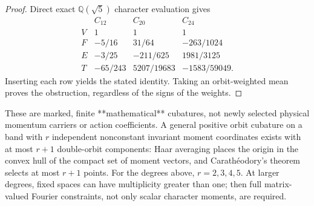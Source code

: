\documentclass[11pt]{article}
\begin{document}
\begin{proof}
Direct exact $\mathbb Q(\sqrt5)$ character evaluation gives
\[
\begin{array}{c|ccc}
& C_{12}&C_{20}&C_{24}\\\hline
V&1&1&1\\
F&-5/16&31/64&-263/1024\\
E&-3/25&-211/625&1981/3125\\
T&-65/243&5207/19683&-1583/59049.
\end{array}
\]
Inserting each row yields the stated identity. Taking an orbit-weighted
mean proves the obstruction, regardless of the signs of the weights.
\end{proof}

\begin{remark}
These are marked, finite **mathematical** cubatures, not newly selected
physical momentum carriers or action coefficients. A general positive
orbit cubature on a band with $r$ independent nonconstant invariant
moment coordinates exists with at most $r+1$ double-orbit components:
Haar averaging places the origin in the convex hull of the compact set
of moment vectors, and Carath\'eodory's theorem selects at most $r+1$
points. For the degrees above, $r=2,3,4,5$. At larger degrees, fixed
spaces can have multiplicity greater than one; then full matrix-valued
Fourier constraints, not only scalar character moments, are required.
\end{remark}
\end{document}
